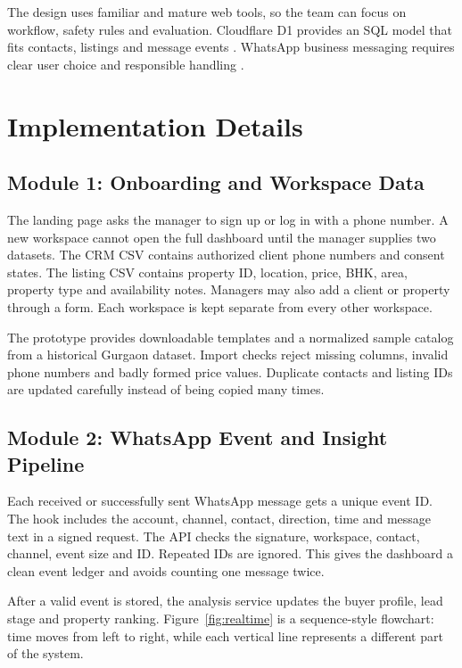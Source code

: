 \documentclass{tietreport}
\begin{document}
The design uses familiar and mature web tools, so the team can focus on workflow,
safety rules and evaluation. Cloudflare D1 provides an SQL model that fits
contacts, listings and message events \cite{cloudflared1}. WhatsApp business
messaging requires clear user choice and responsible handling
\cite{whatsapppolicy}.

\section{Implementation Details}

\subsection{Module 1: Onboarding and Workspace Data}

The landing page asks the manager to sign up or log in with a phone number. A
new workspace cannot open the full dashboard until the manager supplies two
datasets. The CRM CSV contains authorized client phone numbers and consent
states. The listing CSV contains property ID, location, price, BHK, area,
property type and availability notes. Managers may also add a client or property
through a form. Each workspace is kept separate from every other workspace.

The prototype provides downloadable templates and a normalized sample catalog
from a historical Gurgaon dataset. Import checks reject missing columns, invalid
phone numbers and badly formed price values. Duplicate contacts and listing IDs
are updated carefully instead of being copied many times.

\subsection{Module 2: WhatsApp Event and Insight Pipeline}

Each received or successfully sent WhatsApp message gets a unique event ID. The
hook includes the account, channel, contact, direction, time and message text in
a signed request. The API checks the signature, workspace, contact, channel,
event size and ID. Repeated IDs are ignored. This gives the dashboard a clean
event ledger and avoids counting one message twice.

After a valid event is stored, the analysis service updates the buyer profile,
lead stage and property ranking. Figure~\ref{fig:realtime} is a sequence-style
flowchart: time moves from left to right, while each vertical line represents a
different part of the system.
\end{document}
